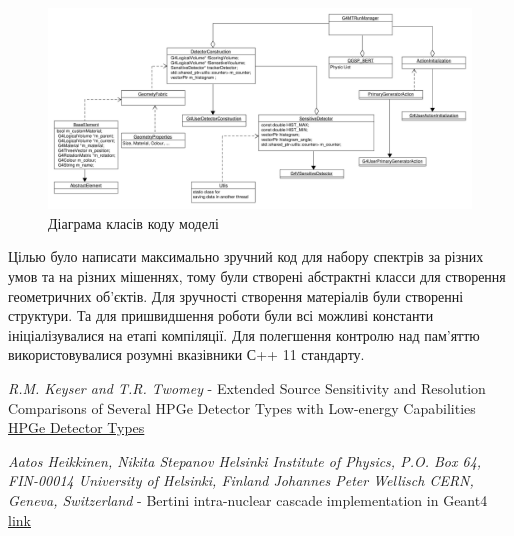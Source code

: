 \documentclass[a4paper, 14pt]{article}
\numberwithin{equation}{section}
\numberwithin{table}{section}
\begin{document}
	\begin{figure}[hbt!]
		\centering \includegraphics[width=1\textwidth]{res/classDiagram.pdf}
		\caption{Діаграма класів коду моделі} 
		\label{ris:s_classDiagram}	
	\end{figure} 

	Цілью було написати максимально зручний код для набору спектрів за різних умов та на різних мішеннях, тому були створені абстрактні класси для створення геометричних об'єктів. Для зручності створення матеріалів були створенні структури. 
	Та для пришвидшення роботи були всі можливі константи ініціалізувалися на етапі компіляції. Для полегшення контролю над пам'яттю використовувалися розумні вказівники С++ 11 стандарту.

\newpage
\begin{thebibliography}{}
	
	 \textit{R.M. Keyser and T.R. Twomey} - Extended Source Sensitivity and Resolution Comparisons of Several HPGe Detector Types with Low-energy Capabilities \\
	\href{https://www.ortec-online.com/-/media/ametekortec/technical%20papers/high%20purity%20germanium%20detector%20applications%20and%20technology%20developements/extended-source-sensitivity-resolution-comparisons-several-hpge-detector-types-low-energy-capabilities.pdf?la=en}{ HPGe Detector Types}
		
	 \textit{Aatos Heikkinen, Nikita Stepanov Helsinki Institute of Physics, P.O. Box 64, FIN-00014 University of Helsinki, Finland Johannes Peter Wellisch CERN, Geneva, Switzerland} - Bertini intra-nuclear cascade implementation in Geant4
	\href{https://www.slac.stanford.edu/econf/C0303241/proc/papers/MOMT008.PDF}{link}
	
\end{thebibliography}
\end{document}

